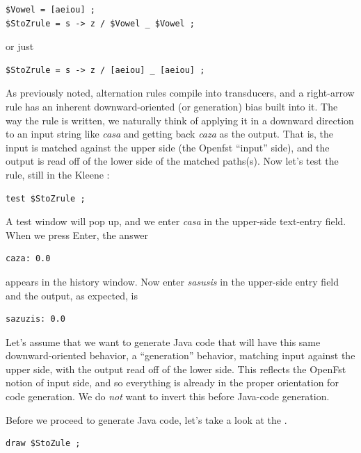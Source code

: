 \begin{Verbatim}
$Vowel = [aeiou] ;
$StoZrule = s -> z / $Vowel _ $Vowel ;
\end{Verbatim}

\noindent
or just

\begin{Verbatim}
$StoZrule = s -> z / [aeiou] _ [aeiou] ;
\end{Verbatim}

\noindent
As previously noted, alternation rules compile into transducers, and a right-arrow rule has an inherent downward-oriented (or
generation) bias
built into it.   The way the rule is written, we naturally think of applying it in a downward direction to an input string
like \emph{casa} and getting back \emph{caza} as the output.   That is, the input is matched against the upper side (the Openfst
``input'' side), and the output is read off of the lower side of the matched paths(s).  Now let's test the rule, still in the Kleene \gui{}:


\begin{Verbatim}
test $StoZrule ;
\end{Verbatim}

\noindent
A test window will pop up, and we enter \emph{casa} in the upper-side text-entry field.  When we press Enter, the answer

\begin{Verbatim}
caza: 0.0
\end{Verbatim}

\noindent
appears in the history window.  Now enter
\emph{sasusis} in the upper-side entry field and the output, as expected, is

\begin{Verbatim}
sazuzis: 0.0
\end{Verbatim} 

Let's assume that we want to generate Java code that will have this same
downward-oriented behavior, a ``generation'' behavior, matching input
against the upper side, with the output read off of the lower side.  
This reflects the OpenFst notion of input side,
and so everything is already in the proper orientation for code generation.  We do \emph{not} want
to invert this \fsm{} before Java-code generation.

Before we proceed to generate Java code, let's take a look at the \fsm{}.

\begin{Verbatim}
draw $StoZule ;
\end{Verbatim}


